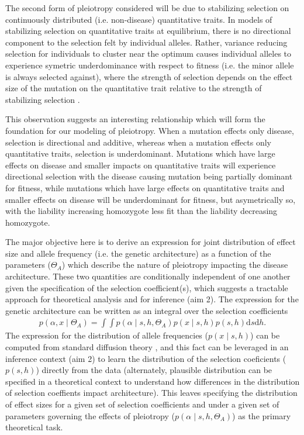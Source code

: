 \documentclass[11pt]{article}
\begin{document}
The second form of pleiotropy considered will be due to stabilizing selection on continuously distributed (i.e. non-disease) quantitative traits. In models of stabilizing selection on quantitative traits at equilibrium, there is no directional component to the selection felt by individual alleles. Rather, variance reducing selection for individuals to cluster near the optimum causes individual alleles to experience symetric underdominance with respect to fitness (i.e. the minor allele is always selected against), where the strength of selection depends on the effect size of the mutation on the quantitative trait relative to the strength of stabilizing selection \cite{Robertson:1956dk}.

This observation suggests an interesting relationship which will form the foundation for our modeling of pleiotropy. When a mutation effects only disease, selection is directional and additive, whereas when a mutation effects only quantitative traits, selection is underdominant. Mutations which have large effects on disease and smaller impacts on quantitative traits will experience directional selection with the disease causing mutation being partially dominant for fitness, while mutations which have large effects on quantitative traits and smaller effects on disease will be underdominant for fitness, but asymetrically so, with the liability increasing homozygote less fit than the liability decreasing homozygote.

The major objective here is to derive an expression for joint distribution of effect size and allele frequency (i.e. the genetic architecture) as a function of the parameters ($\Theta_A$) which describe the nature of pleiotropy impacting the disease architecture. These two quantities are conditionally independent of one another given the specification of the selection coefficient(s), which suggests a tractable approach for theoretical analysis and for inference (aim 2). The expression for the genetic architecture can be written as an integral over the selection coefficients
\begin{align}
  p\left(\alpha,x \mid \Theta_A\right) = \int \int p\left(\alpha \mid s,h,\Theta_A\right) p\left(x \mid s,h \right) p\left(s,h\right)\mathrm{d}s \mathrm{d}h.
  \label{exp-for-arch}
\end{align}
The expression for the distribution of allele frequencies ($p\left(x \mid s,h\right)$) can be computed from standard diffusion theory \cite{Ewens}, and this fact can be leveraged in an inference context (aim 2) to learn the distribution of the selection coeficients ($p\left(s,h\right)$) directly from the data (alternately, plausible distribution can be specified in a theoretical context to understand how differences in the distribution of selection coeffients impact architecture). This leaves specifying the distribution of effect sizes for a given set of selection coefficients and under a given set of parameters governing the effects of pleiotropy ($p\left(\alpha \mid s,h,\Theta_A\right)$) as the primary theoretical task.
\end{document}
